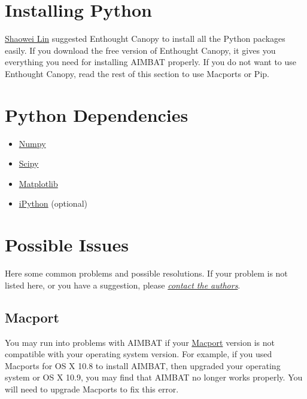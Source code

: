 \documentclass[letterpaper,10pt,english]{sphinxmanual}
\begin{document}
\section{Installing Python}
\label{docfiles/install_dependencies:installing-python}
\href{http://www1.i2r.a-star.edu.sg/~lins/codes/python.html}{Shaowei Lin} suggested Enthought Canopy to install all the Python packages easily. If you download the free version of Enthought Canopy, it gives you everything you need for installing AIMBAT properly. If you do not want to use Enthought Canopy, read the rest of this section to use Macports or Pip.


\section{Python Dependencies}
\label{docfiles/install_dependencies:python-dependencies}\begin{itemize}
\item {} 
\href{http://www.numpy.org/}{Numpy}

\item {} 
\href{http://www.scipy.org/}{Scipy}

\item {} 
\href{http://matplotlib.org/}{Matplotlib}

\item {} 
\href{http://ipython.org/}{iPython} (optional)

\end{itemize}


\section{Possible Issues}
\label{docfiles/install_dependencies:possible-issues}
Here some common problems and possible resolutions. If your problem is not listed here, or you have a suggestion, please {\hyperref[docfiles/introduction:authors-contacts]{\emph{contact the authors}}}.


\subsection{Macport}
\label{docfiles/install_dependencies:macport}
You may run into problems with AIMBAT if your \href{http://www.macports.org/}{Macport} version is not compatible with your operating system version. For example, if you used Macports for OS X 10.8 to install AIMBAT, then upgraded your operating system or OS X 10.9, you may find that AIMBAT no longer works properly. You will need to upgrade Macports to fix this error.
\end{document}
